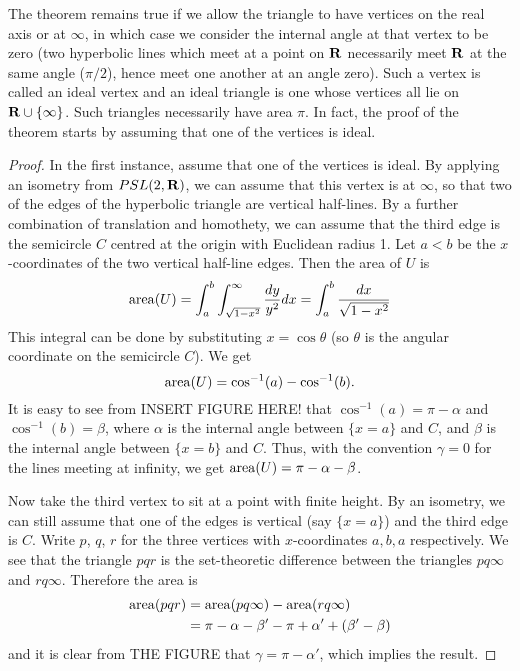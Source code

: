 \documentclass[12pt]{article}
\begin{document}
The theorem remains true if we allow the triangle to have vertices on the real axis or at $\infty$, in which case we consider the internal angle at that vertex to be zero (two hyperbolic lines which meet at a point on $\mathbf{R}$ necessarily meet $\mathbf{R}$ at the same angle ($\pi/2$), hence meet one another at an angle zero). Such a vertex is called an ideal vertex and an ideal triangle is one whose vertices all lie on $\mathbf{R}\cup\{\infty\}$. Such triangles necessarily have area $\pi$. In fact, the proof of the theorem starts by assuming that one of the vertices is ideal.

\begin{proof}
  In the first instance, assume that one of the vertices is ideal. By applying an isometry from $PSL(2,\mathbf{R})$, we can assume that this vertex is at $\infty$, so that two of the edges of the hyperbolic triangle are vertical half-lines. By a further combination of translation and homothety, we can assume that the third edge is the semicircle $C$ centred at the origin with Euclidean radius 1. Let $a<b$ be the $x$-coordinates of the two vertical half-line edges. Then the area of $U$ is
  \[\operatorname{area}(U)=\int_a^b\int_{\sqrt{1-x^2}}^{\infty}\frac{dy}{y^2}dx=\int_a^b\frac{dx}{\sqrt{1-x^2}}\]
  This integral can be done by substituting $x=\cos\theta$ (so $\theta$ is the angular coordinate on the semicircle $C$). We get
  \[\operatorname{area}(U)=\cos^{-1}(a)-\cos^{-1}(b).\]
  It is easy to see from INSERT FIGURE HERE! that $\cos^{-1}(a)=\pi-\alpha$ and $\cos^{-1}(b)=\beta$, where $\alpha$ is the internal angle between $\{x=a\}$ and $C$, and $\beta$ is the internal angle between $\{x=b\}$ and $C$. Thus, with the convention $\gamma=0$ for the lines meeting at infinity, we get $\operatorname{area}(U)=\pi-\alpha-\beta$.

  Now take the third vertex to sit at a point with finite height. By an isometry, we can still assume that one of the edges is vertical (say $\{x=a\}$) and the third edge is $C$. Write $p$, $q$, $r$ for the three vertices with $x$-coordinates $a,b,a$ respectively. We see that the triangle $pqr$ is the set-theoretic difference between the triangles $pq\infty$ and $rq\infty$. Therefore the area is
  \begin{align*}
    \operatorname{area}(pqr)&=\operatorname{area}(pq\infty)-\operatorname{area}(rq\infty)\\
    &=\pi-\alpha-\beta'-\pi+\alpha'+(\beta'-\beta)
  \end{align*}
  and it is clear from THE FIGURE that $\gamma=\pi-\alpha'$, which implies the result.
\end{proof}
\end{document}
